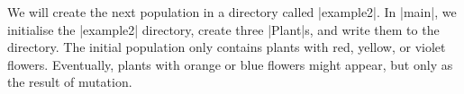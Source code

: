We will create the next population in a directory called |example2|.
In |main|, we initialise the |example2| directory, create three 
|Plant|s, and write them to the directory.
The initial population only contains plants with red, yellow, 
or violet flowers.
Eventually, plants with orange or blue flowers might appear, but only
as the result of mutation.


